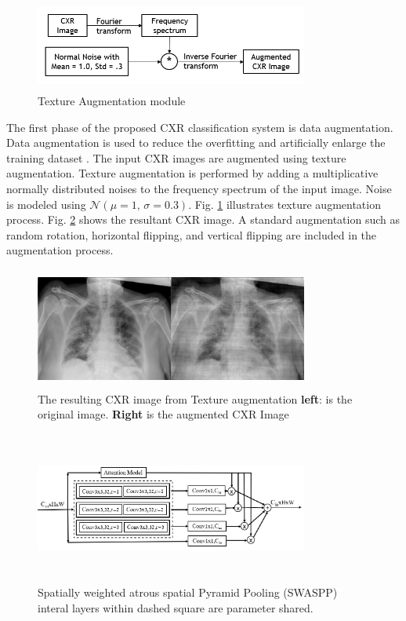 \begin{center}
    \begin{figure}[htbp]
    \centerline{\includegraphics[height=30mm,width=9cm]{Figures/TexAug.PNG}}
    \caption{Texture Augmentation module}
    \label{texaug}
    \end{figure}
    \end{center}
The first phase of the proposed CXR classification system is data augmentation. Data augmentation is used to reduce the overfitting and artificially enlarge the training dataset \cite{krizhevsky2012imagenet}. The input CXR images are augmented  using texture augmentation.  Texture augmentation is performed by adding a multiplicative normally distributed noises to the frequency spectrum of the input image. Noise is modeled using $\mathcal{N}(\mu = 1,\,\sigma = 0.3)$. Fig. \ref{texaug} illustrates texture augmentation process. Fig. \ref{resltaug} shows the resultant CXR image. A standard augmentation such as random rotation, horizontal flipping, and vertical flipping are included in the augmentation process. 

\begin{center}
    \begin{figure}[htbp]
    \centerline{\includegraphics[height=40mm,width=9cm]{Figures/freqJitt.png}}
    \caption{The resulting CXR image from Texture augmentation \textbf{left}: is the original image. \textbf{Right} is the augmented  CXR Image}
    \label{resltaug}
    \end{figure}
    \end{center} 
    

\begin{center}
\begin{figure}[htbp]
\centerline{\includegraphics[height=50mm,width=9cm]{Figures/SWASPP.PNG}}
\caption{Spatially weighted atrous spatial Pyramid Pooling (SWASPP) interal layers within dashed square are parameter shared.}
\label{swaspp}
\end{figure}
\end{center}

